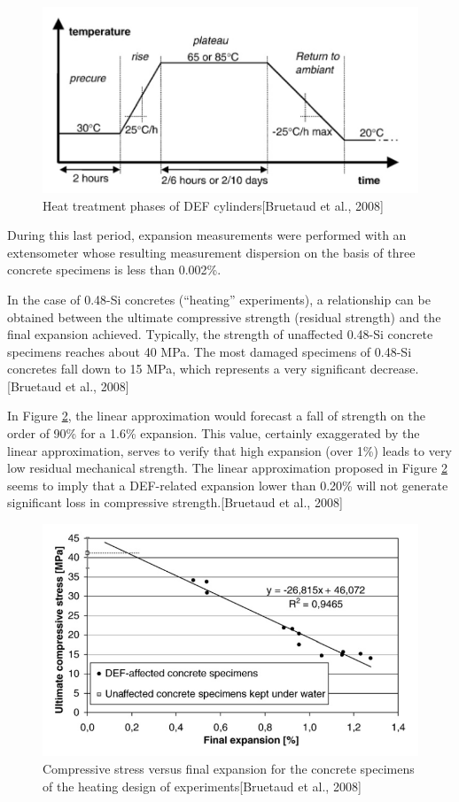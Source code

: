 \begin{figure}[h!]
  \centering
  \includegraphics[width=0.8\linewidth]{Reference/Bruetaud2.png}
  \caption{Heat treatment phases of DEF cylinders[Bruetaud et al., 2008\cite{Bruetaud}]}
  \label{Bruetaud heat}
\end{figure}

During this last period, expansion measurements were performed with an extensometer whose resulting measurement dispersion on the basis of three concrete specimens is less than 0.002\%.

In the case of 0.48-Si concretes (“heating” experiments), a relationship can be obtained between the ultimate compressive strength (residual strength) and the final expansion achieved. Typically, the strength of unaffected 0.48-Si concrete specimens reaches about 40 MPa. The most damaged specimens of 0.48-Si concretes fall down to 15 MPa, which represents a very significant decrease.[Bruetaud et al., 2008]

In Figure \ref{Bruetaud CS}, the linear approximation would forecast a fall of strength on the order of 90\% for a 1.6\% expansion. This value, certainly exaggerated by the linear approximation, serves to verify that high expansion (over 1\%) leads to very low residual mechanical strength. The linear approximation proposed in Figure \ref{Bruetaud CS} seems to imply that a DEF-related expansion lower
than 0.20\% will not generate significant loss in compressive strength.[Bruetaud et al., 2008\cite{Bruetaud}]

\begin{figure}[h!]
  \centering
  \includegraphics[width=0.8\linewidth]{Reference/Bruetaud3.png}
  \caption{Compressive stress versus final expansion for the concrete specimens of the
heating design of experiments[Bruetaud et al., 2008\cite{Bruetaud}]}
  \label{Bruetaud CS}
\end{figure}

